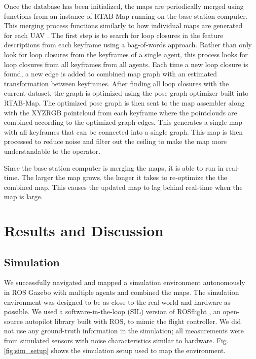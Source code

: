 \documentclass[letterpaper, 10 pt, conference]{ieeeconf}  %
\begin{document}
Once the database has been initialized, the maps are periodically merged using functions from an instance of RTAB-Map running on the base station computer. This merging process functions similarly to how individual maps are generated for each UAV \cite{Labbe2011,Labbe2013,Labbe2019}. The first step is to search for loop closures in the feature descriptions from each keyframe using a bag-of-words approach. Rather than only look for loop closures from the keyframes of a single agent, this process looks for loop closures from all keyframes from all agents. Each time a new loop closure is found, a new edge is added to combined map graph with an estimated transformation between keyframes. After finding all loop closures with the current dataset, the graph is optimized using the pose graph optimizer built into RTAB-Map. The optimized pose graph is then sent to the map assembler along with the XYZRGB pointcloud from each keyframe where the pointclouds are combined according to the optimized graph edges. This generates a single map with all keyframes that can be connected into a single graph. This map is then processed to reduce noise and filter out the ceiling to make the map more understandable to the operator.

Since the base station computer is merging the maps, it is able to run in real-time. The larger the map grows, the longer it takes to re-optimize the the combined map. This causes the updated map to lag behind real-time when the map is large.
\section{Results and Discussion}\label{results}

\subsection{Simulation}

We successfully navigated and mapped a simulation environment autonomously in ROS Gazebo \cite{Gazebo} with multiple agents and combined the maps. The simulation environment was designed to be as close to the real world and hardware as possible. We used a software-in-the-loop (SIL) version of ROSflight \cite{Jackson2016a}, an open-source autopilot library built with ROS, to mimic the flight controller. We did not use any ground-truth information in the simulation; all measurements were from simulated sensors with noise characteristics similar to hardware. Fig. \ref{fig:sim_setup} shows the simulation setup used to map the environment.
\end{document}
